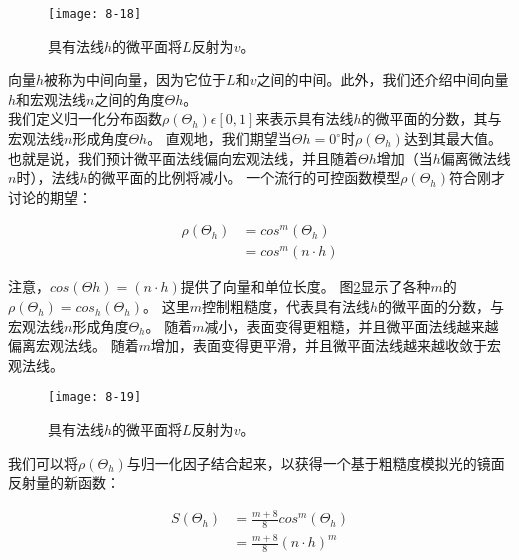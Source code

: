 \begin{figure}[h]
    \label{fig:8-18}
    \texttt{[image: 8-18]}
    \centering
    \caption{具有法线$h$的微平面将$L$反射为$v$。}
\end{figure}

\begin{flushleft}
向量$h$被称为中间向量，因为它位于$L$和$v$之间的中间。此外，我们还介绍中间向量$h$和宏观法线$n$之间的角度$\Theta h$。\\

我们定义归一化分布函数$\rho(\Theta_{h})\epsilon [0,1]$来表示具有法线$h$的微平面的分数，其与宏观法线$n$形成角度$\Theta h$。 直观地，我们期望当$\Theta h=0^{\circ}$时$\rho(\Theta_{h})$达到其最大值。 也就是说，我们预计微平面法线偏向宏观法线，并且随着$\Theta h$增加（当$h$偏离微法线$n$时），法线$h$的微平面的比例将减小。 一个流行的可控函数模型$\rho(\Theta_{h})$符合刚才讨论的期望：\\
\end{flushleft}

\begin{align*}
\rho(\Theta_{h})&=cos^{m}(\Theta_{h})\\
&=cos^{m}(n\cdot h)
\end{align*}

\begin{flushleft}
注意，$cos(\Theta h)=(n\cdot h)$提供了向量和单位长度。 图\ref{fig:8-19}显示了各种$m$的$\rho(\Theta_{h})=cos_{h}(\Theta_{h})$。 这里$m$控制粗糙度，代表具有法线$h$的微平面的分数，与宏观法线$n$形成角度$\Theta_{h}$。 随着$m$减小，表面变得更粗糙，并且微平面法线越来越偏离宏观法线。 随着$m$增加，表面变得更平滑，并且微平面法线越来越收敛于宏观法线。
\end{flushleft}

\begin{figure}[h]
    \label{fig:8-19}
    \texttt{[image: 8-19]}
    \centering
    \caption{具有法线$h$的微平面将$L$反射为$v$。}
\end{figure}

\begin{flushleft}
我们可以将$\rho(\Theta_{h})$与归一化因子结合起来，以获得一个基于粗糙度模拟光的镜面反射量的新函数：\\
\end{flushleft}

\begin{align*}
S(\Theta_{h})&=\frac{m+8}{8}cos^{m}(\Theta_{h})\\
&=\frac{m+8}{8}(n\cdot h)^{m}
\end{align*}

